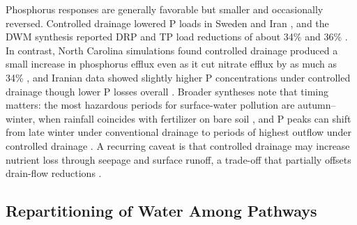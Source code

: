 Phosphorus responses are generally favorable but smaller and occasionally
reversed. Controlled drainage lowered P loads in Sweden and Iran
\parencite{Wesström2007,Wesström2001,Jouni2018}, and the DWM synthesis reported
DRP and TP load reductions of about 34\% and 36\%
\parencite{Frankenberger2024}. In contrast, North Carolina simulations found
controlled drainage produced a small increase in phosphorus efflux even as it
cut nitrate efflux by as much as 34\% \parencite{DEAL1986}, and Iranian data
showed slightly higher P concentrations under controlled drainage though lower P
losses overall \parencite{Jouni2018}. Broader syntheses note that timing matters:
the most hazardous periods for surface-water pollution are autumn--winter, when
rainfall coincides with fertilizer on bare soil \parencite{Tolomio2018}, and P
peaks can shift from late winter under conventional drainage to periods of
highest outflow under controlled drainage \parencite{Wesström2007}. A recurring
caveat is that controlled drainage may increase nutrient loss through seepage
and surface runoff, a trade-off that partially offsets drain-flow reductions
\parencite{Frankenberger2024}.

\subsection{Repartitioning of Water Among Pathways}

